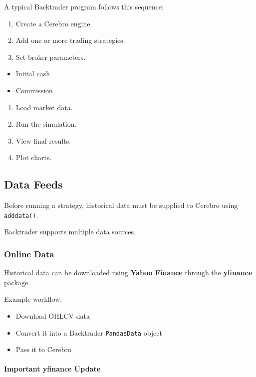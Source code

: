 \documentclass[12pt,openany]{book}
\begin{document}
A typical Backtrader program follows this sequence:

\begin{enumerate}[leftmargin=*]
    \item Create a Cerebro engine.
    \item Add one or more trading strategies.
    \item Set broker parameters.
\end{enumerate}

\begin{itemize}[leftmargin=*]
    \item Initial cash
    \item Commission
\end{itemize}
\begin{enumerate}[leftmargin=*]
    \item Load market data.
    \item Run the simulation.
    \item View final results.
    \item Plot charts.
\end{enumerate}

\subsection{Data Feeds}

Before running a strategy, historical data must be supplied to Cerebro using \texttt{adddata()}.

Backtrader supports multiple data sources.

\subsubsection{Online Data}

Historical data can be downloaded using \textbf{Yahoo Finance} through the \textbf{yfinance} package.

Example workflow:

\begin{itemize}[leftmargin=*]
    \item Download OHLCV data
    \item Convert it into a Backtrader \texttt{PandasData} object
    \item Pass it to Cerebro
\end{itemize}

\paragraph{Important yfinance Update}
\end{document}
